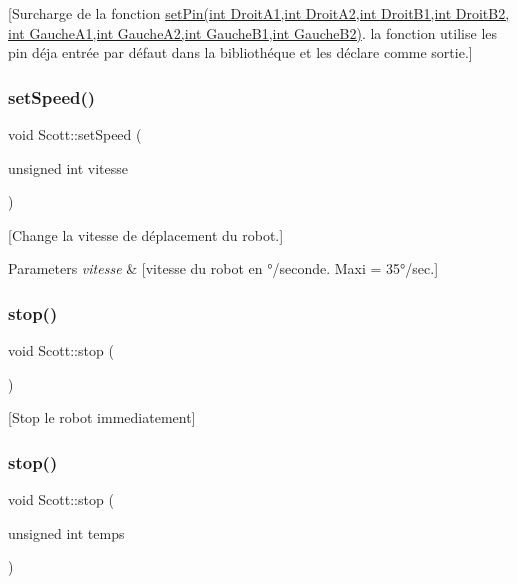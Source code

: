 \mbox{[}Surcharge de la fonction \hyperlink{class_scott_a03810d284564569d63f6afd3548f1504}{set\+Pin(int Droit\+A1,int Droit\+A2,int Droit\+B1,int Droit\+B2, int Gauche\+A1,int Gauche\+A2,int Gauche\+B1,int Gauche\+B2)}. la fonction utilise les pin déja entrée par défaut dans la bibliothéque et les déclare comme sortie.\mbox{]} \hypertarget{class_scott_ae74032c88526e506b0107417ab609ce9}{}\label{class_scott_ae74032c88526e506b0107417ab609ce9} 
\subsubsection{\texorpdfstring{set\+Speed()}{setSpeed()}}
{\footnotesize\ttfamily void Scott\+::set\+Speed (\begin{DoxyParamCaption}\item[{unsigned int}]{vitesse }\end{DoxyParamCaption})}

\mbox{[}Change la vitesse de déplacement du robot.\mbox{]} 
\begin{DoxyParams}{Parameters}
{\em vitesse} & \mbox{[}vitesse du robot en °/seconde. Maxi = 35°/sec.\mbox{]} \\
\hline
\end{DoxyParams}
\hypertarget{class_scott_a30f235072b621cfa3995232b2e9ce8d2}{}\label{class_scott_a30f235072b621cfa3995232b2e9ce8d2} 
\subsubsection{\texorpdfstring{stop()}{stop()}\hspace{0.1cm}{\footnotesize\ttfamily [1/2]}}
{\footnotesize\ttfamily void Scott\+::stop (\begin{DoxyParamCaption}{ }\end{DoxyParamCaption})}

\mbox{[}Stop le robot immediatement\mbox{]} \hypertarget{class_scott_accece4d18e1a5b28b0dc36f5fbbe0757}{}\label{class_scott_accece4d18e1a5b28b0dc36f5fbbe0757} 
\subsubsection{\texorpdfstring{stop()}{stop()}\hspace{0.1cm}{\footnotesize\ttfamily [2/2]}}
{\footnotesize\ttfamily void Scott\+::stop (\begin{DoxyParamCaption}\item[{unsigned int}]{temps }\end{DoxyParamCaption})}

